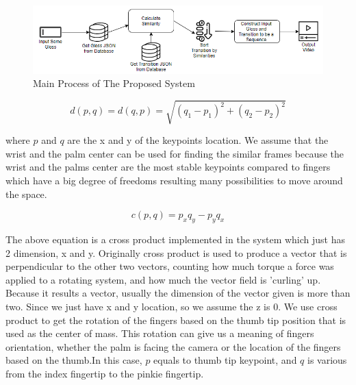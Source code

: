 \documentclass{sig-alternate-05-2015}
\begin{document}
\begin{figure}
	\centering
	\includegraphics[width=\textwidth]{img/process.png}
	\caption{Main Process of The Proposed System}
\end{figure}

\begin{equation}d(p,q)=d(q,p)=\sqrt{(q_1-p_1)^2+(q_2-p_2)^2}\end{equation}

where \begin{math}p\end{math} and \begin{math}q\end{math} are the x and y of the keypoints location. We assume that the wrist and the palm center can be used for finding the similar frames because the wrist and the palms center are the most stable keypoints compared to fingers which have a big degree of freedoms resulting many possibilities to move around the space.

\begin{equation}c(p,q)=p_x q_y-p_y q_x\end{equation}

The above equation is a cross product implemented in the system which just has 2 dimension, x and y. Originally cross product is used to produce a vector that is perpendicular to the other two vectors, counting how much torque a force was applied to a rotating system, and how much the vector field is 'curling' up. Because it results a vector, usually the dimension of the vector given is more than two. Since we just have x and y location, so we assume the z is 0. We use cross product to get the rotation of the fingers based on the thumb tip position that is used as the center of mass. This rotation can give us a meaning of fingers orientation, whether the palm is facing the camera or the location of the fingers based on the thumb.In this case, \begin{math}p\end{math} equals to thumb tip keypoint, and \begin{math}q\end{math} is various from the index fingertip to the pinkie fingertip. 
\end{document}
